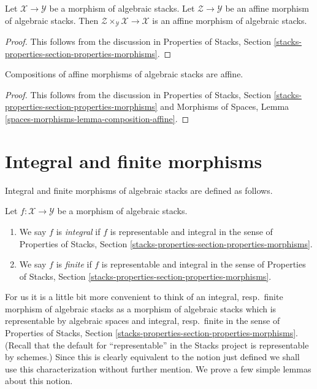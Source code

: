 \begin{lemma}
\label{lemma-base-change-affine}
Let $\mathcal{X} \to \mathcal{Y}$ be a morphism of algebraic stacks.
Let $\mathcal{Z} \to \mathcal{Y}$ be an affine morphism of algebraic
stacks. Then $\mathcal{Z} \times_\mathcal{Y} \mathcal{X} \to \mathcal{X}$
is an affine morphism of algebraic stacks.
\end{lemma}

\begin{proof}
This follows from the discussion in
Properties of Stacks, Section
\ref{stacks-properties-section-properties-morphisms}.
\end{proof}

\begin{lemma}
\label{lemma-composition-affine}
Compositions of affine morphisms of algebraic stacks are affine.
\end{lemma}

\begin{proof}
This follows from the discussion in
Properties of Stacks, Section
\ref{stacks-properties-section-properties-morphisms}
and
Morphisms of Spaces, Lemma \ref{spaces-morphisms-lemma-composition-affine}.
\end{proof}





\section{Integral and finite morphisms}
\label{section-integral}

\noindent
Integral and finite morphisms of algebraic stacks are defined as follows.

\begin{definition}
\label{definition-integral}
Let $f : \mathcal{X} \to \mathcal{Y}$ be a morphism of algebraic stacks.
\begin{enumerate}
\item We say $f$ is {\it integral} if $f$ is representable and integral
in the sense of Properties of Stacks, Section
\ref{stacks-properties-section-properties-morphisms}.
\item We say $f$ is {\it finite} if $f$ is representable and integral
in the sense of Properties of Stacks, Section
\ref{stacks-properties-section-properties-morphisms}.
\end{enumerate}
\end{definition}

\noindent
For us it is a little bit more convenient to think of an
integral, resp.\ finite morphism of algebraic stacks as a
morphism of algebraic stacks which is
representable by algebraic spaces and integral, resp.\ finite
in the sense of Properties of Stacks, Section
\ref{stacks-properties-section-properties-morphisms}.
(Recall that the default for ``representable'' in the Stacks project
is representable by schemes.)
Since this is clearly equivalent to the notion just defined we shall
use this characterization without further mention.
We prove a few simple lemmas about this notion.


